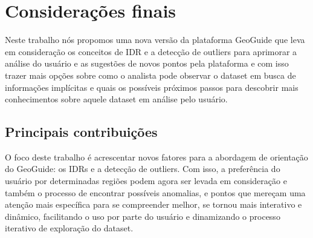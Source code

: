 \chapter{Considerações finais}
\label{chap:consideracoes}



Neste trabalho nós propomos uma nova versão da plataforma GeoGuide \cite{omidvarTehrani2017} que leva em consideração os conceitos de IDR e a detecção de outliers para aprimorar a análise do usuário e as sugestões de novos pontos pela plataforma e com isso trazer mais opções sobre como o analista pode observar o dataset em busca de informações implícitas e quais os possíveis próximos passos para descobrir mais conhecimentos sobre aquele dataset em análise pelo usuário.

\section{Principais contribuições}

O foco deste trabalho é acrescentar novos fatores para a abordagem de orientação do GeoGuide: os IDRs e a detecção de outliers. Com isso, a preferência do usuário por determinadas regiões podem agora ser levada em consideração e também o processo de encontrar possíveis anomalias, e pontos que mereçam uma atenção mais específica para se compreender melhor, se tornou mais interativo e dinâmico, facilitando o uso por parte do usuário e dinamizando o processo iterativo de exploração do dataset.

